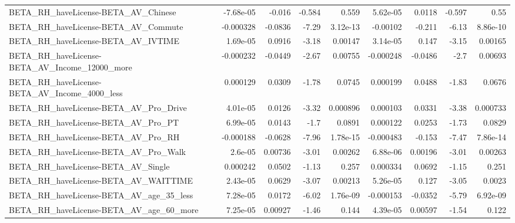 \begin{tabular}{lrrrrrrrr}
BETA\_RH\_haveLicense-BETA\_AV\_Chinese                &   -7.68e-05 &       -0.016 &    -0.584 &    0.559 &   5.62e-05 &      0.0118 &       -0.597 &          0.55 \\
BETA\_RH\_haveLicense-BETA\_AV\_Commute                &   -0.000328 &      -0.0836 &     -7.29 & 3.12e-13 &   -0.00102 &      -0.211 &        -6.13 &      8.86e-10 \\
BETA\_RH\_haveLicense-BETA\_AV\_IVTIME                 &    1.69e-05 &       0.0916 &     -3.18 &  0.00147 &   3.14e-05 &       0.147 &        -3.15 &       0.00165 \\
BETA\_RH\_haveLicense-BETA\_AV\_Income\_12000\_more      &   -0.000232 &      -0.0449 &     -2.67 &  0.00755 &  -0.000248 &     -0.0486 &         -2.7 &       0.00693 \\
BETA\_RH\_haveLicense-BETA\_AV\_Income\_4000\_less       &    0.000129 &       0.0309 &     -1.78 &   0.0745 &   0.000199 &      0.0488 &        -1.83 &        0.0676 \\
BETA\_RH\_haveLicense-BETA\_AV\_Pro\_Drive              &    4.01e-05 &       0.0126 &     -3.32 & 0.000896 &   0.000103 &      0.0331 &        -3.38 &      0.000733 \\
BETA\_RH\_haveLicense-BETA\_AV\_Pro\_PT                 &    6.99e-05 &       0.0143 &      -1.7 &   0.0891 &   0.000122 &      0.0253 &        -1.73 &        0.0829 \\
BETA\_RH\_haveLicense-BETA\_AV\_Pro\_RH                 &   -0.000188 &      -0.0628 &     -7.96 & 1.78e-15 &  -0.000483 &      -0.153 &        -7.47 &      7.86e-14 \\
BETA\_RH\_haveLicense-BETA\_AV\_Pro\_Walk               &     2.6e-05 &      0.00736 &     -3.01 &  0.00262 &   6.88e-06 &     0.00196 &        -3.01 &       0.00263 \\
BETA\_RH\_haveLicense-BETA\_AV\_Single                 &    0.000242 &       0.0502 &     -1.13 &    0.257 &   0.000334 &      0.0692 &        -1.15 &         0.251 \\
BETA\_RH\_haveLicense-BETA\_AV\_WAITTIME               &    2.43e-05 &       0.0629 &     -3.07 &  0.00213 &   5.26e-05 &       0.127 &        -3.05 &        0.0023 \\
BETA\_RH\_haveLicense-BETA\_AV\_age\_35\_less            &    7.28e-05 &       0.0172 &     -6.02 & 1.76e-09 &  -0.000153 &     -0.0352 &        -5.79 &      6.92e-09 \\
BETA\_RH\_haveLicense-BETA\_AV\_age\_60\_more            &    7.25e-05 &      0.00927 &     -1.46 &    0.144 &   4.39e-05 &     0.00597 &        -1.54 &         0.122 \\

\end{tabular}
